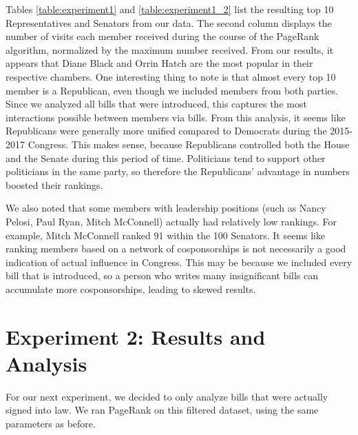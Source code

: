 \documentclass[11pt]{article}
\begin{document}
Tables \ref{table:experiment1} and \ref{table:experiment1_2} list the resulting top 10 Representatives and Senators from our data. The second column displays the number of visits each member received during the course of the PageRank algorithm, normalized by the maximum number received. From our results, it appears that Diane Black and Orrin Hatch are the most popular in their respective chambers. One interesting thing to note is that almost every top 10 member is a Republican, even though we included members from both parties. Since we analyzed all bills that were introduced, this captures the most interactions possible between members via bills. From this analysis, it seems like Republicans were generally more unified compared to Democrats during the 2015-2017 Congress. This makes sense, because Republicans controlled both the House and the Senate during this period of time. Politicians tend to support other politicians in the same party, so therefore the Republicans' advantage in numbers boosted their rankings. 

We also noted that some members with leadership positions (such as Nancy Pelosi, Paul Ryan, Mitch McConnell) actually had relatively low rankings. For example, Mitch McConnell ranked 91 within the 100 Senators. It seems like ranking members based on a network of cosponsorships is not necessarily a good indication of actual influence in Congress. This may be because we included every bill that is introduced, so a person who writes many insignificant bills can accumulate more cosponsorships, leading to skewed results.

\section*{Experiment 2: Results and Analysis}
For our next experiment, we decided to only analyze bills that were actually signed into law. We ran PageRank on this filtered dataset, using the same parameters as before. 
\end{document}
